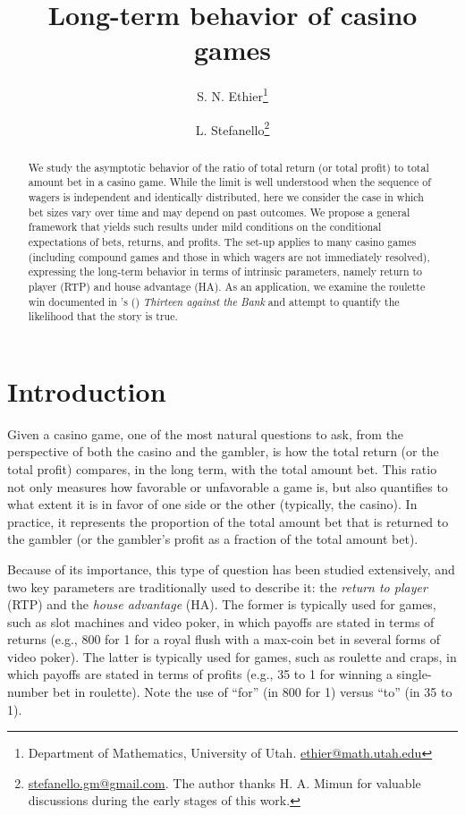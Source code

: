\documentclass{article}
\title{Long-term behavior of casino games}
\author{
S. N. Ethier\thanks{Department of Mathematics, University of Utah. \href{mailto:ethier@math.utah.edu}{ethier@math.utah.edu}} 
\and 
L. Stefanello\thanks{\href{mailto:stefanello.gm@gmail.com}{stefanello.gm@gmail.com}. The author thanks H. A. Mimun for valuable discussions during the early stages of this work.}
}
\date{}
\theoremstyle{definition}
\theoremstyle{remark}
\begin{document}
\maketitle

\begin{abstract}
We study the asymptotic behavior of the ratio of total return (or total profit) to total amount bet in a casino game. While the limit is well understood when the sequence of wagers is independent and identically distributed, here we consider the case in which bet sizes vary over time and may depend on past outcomes. We propose a general framework that yields such results under mild conditions on the conditional expectations of bets, returns, and profits. The set-up applies to many casino games (including compound games and those in which wagers are not immediately resolved), expressing the long-term behavior in terms of intrinsic parameters, namely return to player (RTP) and house advantage (HA). As an application, we examine the roulette win documented in \citeauthor{L76}'s (\citeyear{L76}) \textit{Thirteen against the Bank} and attempt to quantify the likelihood that the story is true.
\end{abstract}





\section{Introduction}

Given a casino game, one of the most natural questions to ask, from the perspective of both the casino and the gambler, is how the total return (or the total profit) compares, in the long term, with the total amount bet.   This ratio not only measures how favorable or unfavorable a game is, but also quantifies to what extent it is in favor of one side or the other (typically, the casino).  In practice, it represents the proportion of the total amount bet that is returned to the gambler (or the gambler's profit as a fraction of the total amount bet).

Because of its importance, this type of question has been studied extensively, and two key parameters are traditionally used to describe it: the \textit{return to player} (RTP) and the \textit{house advantage} (HA).   The former is typically used for games, such as slot machines and video poker, in which payoffs are stated in terms of returns (e.g., 800 for 1 for a royal flush with a max-coin bet in several forms of video poker).  The latter is typically used for games, such as roulette and craps, in which payoffs are stated in terms of profits (e.g., 35 to 1 for winning a single-number bet in roulette).  Note the use of ``for'' (in 800 for 1) versus ``to'' (in 35 to 1).
\end{document}
